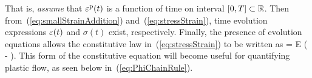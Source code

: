 That is, {\em assume} that $\varepsilon^{\mbox{\footnotesize p}}(t)$ is a 
function of time on interval $[0, T] \subset \mathbb{R}$.  
Then from~(\ref{eq:smallStrainAddition}) and~(\ref{eq:stressStrain}), 
time evolution expressions $\varepsilon(t)$ and $\sigma(t)$ exist, respectively.  
Finally, the presence of evolution equations allows the constitutive law 
in~(\ref{eq:stressStrain}) to be
written as
\be
 \sigmadot = E \left( \hstraindot - \hstrainpdot \right).
 \label{eq:stressStrainRate}
\ee
This form of the constitutive equation will 
become useful for quantifying plastic 
flow, as seen below in~(\ref{eq:PhiChainRule}).


%
%
%

